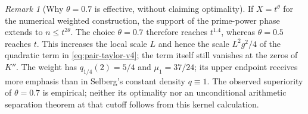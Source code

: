 \documentclass[11pt,a4paper]{article}
\numberwithin{equation}{section}
\theoremstyle{definition}
\theoremstyle{remark}
\newtheorem{remark}[theorem]{Remark}
\begin{document}
\begin{remark}[Why $\theta=0.7$ is effective, without claiming optimality]
If $X=t^\theta$ for the numerical weighted construction, the
support of the prime-power phase extends to $n\le t^{2\theta}$.
The choice $\theta=0.7$ therefore reaches $t^{1.4}$, whereas
$\theta=0.5$ reaches $t$. This increases the local scale $L$ and hence the scale
$L^2g^2/4$ of the quadratic term in \eqref{eq:pair-taylor-v4}; the term
itself still vanishes at the zeros of $K''$.
The weight has $q_{1/4}(2)=5/4$ and $\mu_1=37/24$; its upper
endpoint receives more emphasis than in Selberg's constant density
$q\equiv1$. The observed superiority of $\theta=0.7$ is empirical;
neither its optimality nor an unconditional arithmetic separation
theorem at that cutoff follows from this kernel calculation.
\end{remark}

\end{document}
